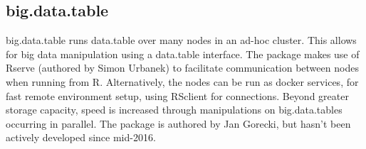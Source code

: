 \hypertarget{sec:big.data.table}{%
    \subsection{big.data.table}\label{sec:big.data.table}}

big.data.table runs data.table over many nodes in an ad-hoc
cluster\cite{gorecki16}. This allows for big data manipulation using a
data.table interface. The package makes use of Rserve (authored by Simon
Urbanek) to facilitate communication between nodes when running from R.
Alternatively, the nodes can be run as docker services, for fast remote
environment setup, using RSclient for connections. Beyond greater
storage capacity, speed is increased through manipulations on
big.data.tables occurring in parallel. The package is authored by Jan
Gorecki, but hasn't been actively developed since mid-2016.
